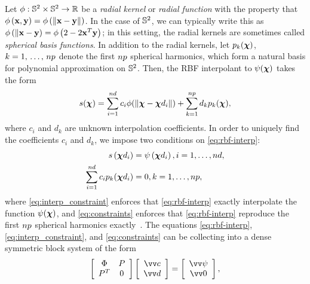 Let $\phi : \mathbb{S}^2 \times \mathbb{S}^2 \to \mathbb{R}$ be a \emph{radial kernel} or \emph{radial function} with the property that $\phi\left({\bf x},{\bf y}\right) = \phi\left(\|{\bf x} - {\bf y}\|\right)$. In the case of $\mathbb{S}^2$, we can typically write this as $\phi\left(\|{\bf x} - {\bf y}\right) = \phi\left(2 - 2 {\bf x}^T {\bf y}\right)$; in this setting, the radial kernels are sometimes called \emph{spherical basis functions}. In addition to the radial kernels, let $p_k(\boldsymbol{\chi})$,
$k=1,\,\ldots,\,\poly\cardinality$ denote the first $\poly \cardinality$ spherical harmonics, which form a natural basis for polynomial approximation on $\mathbb{S}^2$. Then, the RBF interpolant to $\psi(\boldsymbol{\chi})$ takes the form
\begin{equation}\label{eq:rbf-interp}
    s(\Xp)
    = \sum_{i=1}^{\data\cardinality} c_i \phi(\|\Xp-\data\Xp_i\|)
    + \sum_{k=1}^{\poly\cardinality} d_k p_k(\Xp),
\end{equation}
where $c_i$ and $d_k$ are unknown interpolation coefficients. In order to uniquely find the coefficients $c_i$ and $d_k$, we impose two conditions on \eqref{eq:rbf-interp}:
\begin{align}
s\left(\data\Xp_i \right) &= \psi\left(\data\Xp_i\right), i=1,\ldots,\data\cardinality, \label{eq:interp_constraint}\\
\sum_{i=1}^{\data\cardinality} c_i p_k(\data\Xp_i) &= 0, k=1,\ldots,\poly\cardinality,\label{eq:constraints}
\end{align}
where \eqref{eq:interp_constraint} enforces that \eqref{eq:rbf-interp} exactly interpolate the function $\psi(\boldsymbol{\chi})$, and \eqref{eq:constraints} enforces that \eqref{eq:rbf-interp} reproduce the first $\poly\cardinality$ spherical harmonics exactly~\cite{Fasshauer:2007ui}. The equations \eqref{eq:rbf-interp}, \eqref{eq:interp_constraint}, and \eqref{eq:constraints} can be collecting into a dense symmetric block system of the form
\begin{equation}\label{eq:rbf-interp-matrix}
    \left[\begin{array}{cc}
            \Phi & P \\ P^T & 0
    \end{array}\right]\left[\begin{array}{c}
            \arr{c} \\ \arr{d}
    \end{array}\right] = \left[\begin{array}{c}
            \arr{\psi} \\ \arr{0}
    \end{array}\right],
\end{equation}
